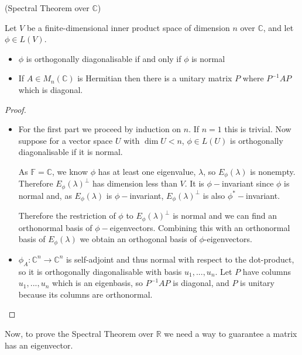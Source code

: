 \begin{theorem} (Spectral Theorem over $\mathbb{C}$)

  \noindent Let $V$ be a finite-dimensional inner product space of dimension $n$ over $\mathbb{C}$, and let $\phi \in L(V)$.
  \begin{itemize}

    \item $\phi$ is orthogonally diagonalisable if and only if $\phi$ is normal
    \item If $A \in M_n(\mathbb{C})$ is Hermitian then there is a unitary matrix $P$ where $P^{-1}AP$ which is diagonal.
  \end{itemize}
\end{theorem}
\begin{proof} $ $

  \begin{itemize}
      
    \item For the first part we proceed by induction on $n$. If $n = 1$ this is trivial. Now suppose for a vector space $U$ with $\dim U < n$, $\phi \in L(U)$ is orthogonally diagonalisable if it is normal.

    As $\mathbb{F} = \mathbb{C}$, we know $\phi$ has at least one eigenvalue, $\lambda$, so $E_\phi(\lambda)$ is nonempty. Therefore $E_\phi(\lambda)^\perp$ has dimension less than $V$. It is $\phi-$invariant since $\phi$ is normal and, as $E_\phi(\lambda)$ is $\phi-$invariant, $E_\phi(\lambda)^\perp$ is also $\phi^*-$invariant. 

    Therefore the restriction of $\phi$ to $E_\phi(\lambda)^\perp$ is normal and we can find an orthonormal basis of $\phi-$eigenvectors. Combining this with an orthonormal basis of $E_\phi(\lambda)$ we obtain an orthogonal basis of $\phi$-eigenvectors.
  \item $\phi_A : \mathbb{C}^n \rightarrow \mathbb{C}^n$ is self-adjoint and thus normal with respect to the dot-product, so it is orthogonally diagonalisable with basis $u_1,...,u_n$. Let $P$ have columns $u_1,...,u_n$ which is an eigenbasis, so $P^{-1} A P$ is diagonal, and $P$ is unitary because its columns are orthonormal.
  \end{itemize}
\end{proof}

Now, to prove the Spectral Theorem over $\mathbb{R}$ we need a way to guarantee a matrix has an eigenvector.

